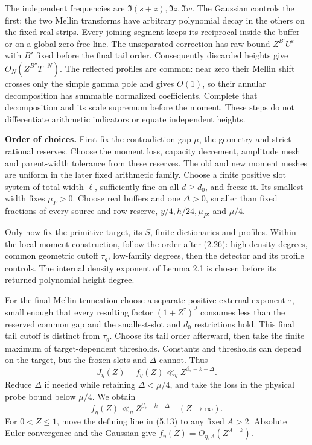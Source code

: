 \documentclass[11pt,a4paper]{article}
\begin{document}
The independent frequencies are \(\Im(s+z),\Im z,\Im w\). The Gaussian
controls the first; the two Mellin transforms have arbitrary polynomial
decay in the others on the fixed real strips. Every joining segment
keeps its reciprocal inside the buffer or on a global zero-free line.
The unseparated correction has raw bound \(Z^{B'}U^\varepsilon\) with
\(B'\) fixed before the final tail order. Consequently discarded heights
give \(O_N(Z^{B''}T^{-N})\). The reflected profiles are common: near
zero their Mellin shift crosses only the simple gamma pole and gives
\(O(1)\), so their annular decomposition has summable normalized
coefficients. Complete that decomposition and its scale supremum before
the moment. These steps do not differentiate arithmetic indicators or
equate independent heights.

\textbf{Order of choices.} First fix the contradiction gap \(\mu\), the
geometry and strict rational reserves. Choose the moment loss, capacity
decrement, amplitude mesh and parent-width tolerance from these
reserves. The old and new moment meshes are uniform in the later fixed
arithmetic family. Choose a finite positive slot system of total width
\(\ell\), sufficiently fine on all \(d\ge d_0\), and freeze it. Its
smallest width fixes \(\mu_P>0\). Choose real buffers and one
\(\Delta>0\), smaller than fixed fractions of every source and row
reserve, \(y/4,h/24,\mu_P\), and \(\mu/4\).

Only now fix the primitive target, its \(S\), finite dictionaries and
profiles. Within the local moment construction, follow the order after
(2.26): high-density degrees, common geometric cutoff \(\tau_g\),
low-family degrees, then the detector and its profile controls. The
internal density exponent of Lemma 2.1 is chosen before its returned
polynomial height degree.

For the final Mellin truncation choose a separate positive external
exponent \(\tau\), small enough that every resulting factor
\((1+Z^\tau)^J\) consumes less than the reserved common gap and the
smallest-slot and \(d_0\) restrictions hold. This final tail cutoff is
distinct from \(\tau_g\). Choose its tail order afterward, then take the
finite maximum of target-dependent thresholds. Constants and thresholds
can depend on the target, but the frozen slots and \(\Delta\) cannot.
Thus \[
J_\eta(Z)-f_\eta(Z)\ll_\eta
 Z^{\beta_*-k-\Delta}.
\tag{5.17}
\] Reduce \(\Delta\) if needed while retaining \(\Delta<\mu/4\), and
take the loss in the physical probe bound below \(\mu/4\). We obtain \[
f_\eta(Z)\ll_\eta Z^{\beta_*-k-\Delta}\quad(Z\to\infty).
\tag{5.18}
\] For \(0<Z\le1\), move the defining line in (5.13) to any fixed
\(A>2\). Absolute Euler convergence and the Gaussian give
\(f_\eta(Z)=O_{\eta,A}(Z^{A-k})\).
\end{document}
